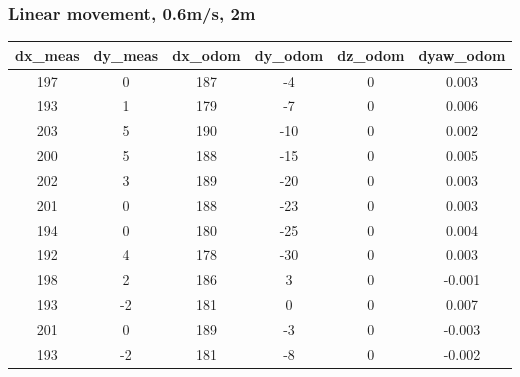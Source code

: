 \documentclass[a4paper, 12pt]{article}
\begin{document}
    \subsubsection{Linear movement, 0.6m/s, 2m}
    \begin{table}[H]
    \scriptsize
    \begin{tabular}{@{}cccccc@{}}
    \toprule
    \textbf{dx\_meas} & \textbf{dy\_meas} & \textbf{dx\_odom} & \textbf{dy\_odom} & \textbf{dz\_odom} & \textbf{dyaw\_odom} \\ \midrule
    197                   & 0                     & 187               & -4                & 0                 & 0.003               \\
    193                   & 1                     & 179               & -7                & 0                 & 0.006               \\
    203                   & 5                     & 190               & -10               & 0                 & 0.002               \\
    200                   & 5                     & 188               & -15               & 0                 & 0.005               \\
    202                   & 3                     & 189               & -20               & 0                 & 0.003               \\
    201                   & 0                     & 188               & -23               & 0                 & 0.003               \\
    194                   & 0                     & 180               & -25               & 0                 & 0.004               \\
    192                   & 4                     & 178               & -30               & 0                 & 0.003               \\
    198                   & 2                     & 186               & 3                 & 0                 & -0.001              \\
    193                   & -2                    & 181               & 0                 & 0                 & 0.007               \\
    201                   & 0                     & 189               & -3                & 0                 & -0.003              \\
    193                   & -2                    & 181               & -8                & 0                 & -0.002              \\

\end{tabular}
\end{table}
\end{document}
